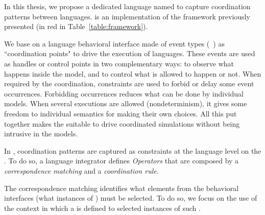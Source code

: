 In this thesis, we propose a dedicated language named \bcool to capture coordination patterns between languages. \bcool is an implementation of the framework previously presented (in red in Table~\ref{table:framework}).  

We base on a language behavioral interface made of event types (\ie \dse~\cite{sle13-combemale}) as ``coordination points" to drive the execution of languages. These events are used as handles or control points in two complementary ways: to observe what happens inside the model, and to control what is allowed to happen or not. When required by the coordination, constraints are used to forbid or delay some event occurrences. Forbidding occurrences reduces what can be done by individual models. When several executions are allowed
(nondeterminism), it gives some freedom to individual semantics for making their own choices. All this put together makes the \dse suitable to drive coordinated simulations without being intrusive in the models. 

In \bcool, coordination patterns are captured as constraints at the language level on the \dse. To do so, a language integrator defines \emph{Operators} that are composed by a \emph{correspondence matching} and a \emph{coordination rule}. 

The correspondence matching identifies what elements from the behavioral interfaces (\ie what instances of \dse) must be selected. To do so, we focus on the use of the context in which a \dse is defined to selected instances of such \dse. 

